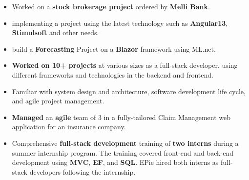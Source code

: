 \documentclass[10pt,a4paper,ragged2e,withhyper]{files/altacv}
\begin{document}
\begin{paracol}{2}
\begin{itemize}
\item Worked on a  \textbf{stock brokerage project} ordered by \textbf{Melli Bank}. 

\item implementing a project using the latest technology such as \textbf{Angular13}, \textbf{Stimulsoft} and other needs.
\item build a  \textbf{Forecasting} Project on a \textbf{Blazor} framework using ML.net.


\end{itemize}

\divider

\begin{itemize}

\item \textbf{Worked on 10+ projects} at various sizes as a full-stack developer, using different frameworks and technologies in the backend and frontend. 

\item Familiar with system design and architecture, software development life cycle, and agile project management. 

\item \textbf{Managed} an \textbf{agile} team of 3 in a fully-tailored Claim Management web application for an insurance company.

\item Comprehensive \textbf{full-stack development} training of \textbf{two interns} during a summer internship program. The training covered front-end and back-end development using \textbf{MVC}, \textbf{EF}, and \textbf{SQL}. EPie hired both interns as full-stack developers following the internship.
\end{itemize}















\end{paracol}
\end{document}
